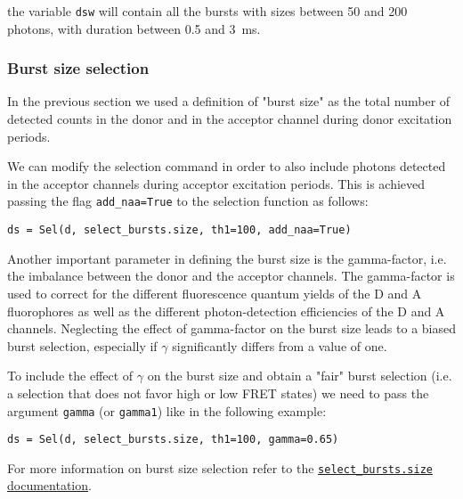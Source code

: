 the variable \verb|dsw| will contain all the bursts with sizes between 50 and
200 photons, with duration between 0.5 and 3~ms.

\subsubsection{Burst size selection}

In the previous section we used a definition of "burst size" as the total number
of detected counts in the donor and in the acceptor channel during donor
excitation periods. 

We can modify the selection command in order to also include photons detected in
the acceptor channels during acceptor excitation periods. This is achieved
passing the flag \verb|add_naa=True| to the selection function as
follows:

\begin{verbatim}
ds = Sel(d, select_bursts.size, th1=100, add_naa=True)
\end{verbatim}

Another important parameter in defining the burst size is the gamma-factor, i.e.
the imbalance between the donor and the acceptor channels. The gamma-factor is
used to correct for the different fluorescence quantum yields of the D and A fluorophores as well as the different photon-detection efficiencies of the D and A channels.
Neglecting the effect of gamma-factor on the burst size leads to a biased burst
selection, especially if $\gamma$ significantly differs from a value of one. 

To include the effect of $\gamma$ on the burst size and obtain a "fair" burst
selection (i.e. a selection that does not favor high or low FRET states) we
need to pass the argument \verb|gamma| (or \verb|gamma1|) like in the following
example:

\begin{verbatim}
ds = Sel(d, select_bursts.size, th1=100, gamma=0.65)
\end{verbatim}

For more information on burst size selection refer to the
\href{http://fretbursts.readthedocs.org/en/latest/burst_selection.html#fretbursts.select\_bursts.size}{\texttt{select\_bursts.size} documentation}.


